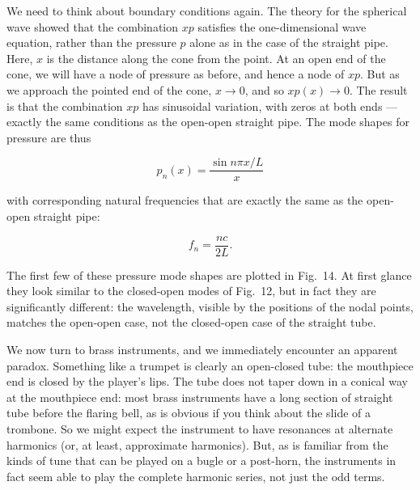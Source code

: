 
  We need to think about boundary conditions again. The theory for the 
  spherical wave showed that the combination $xp$ satisfies the one-dimensional 
  wave equation, rather than the pressure $p$ alone as in the case of the 
  straight pipe. Here, $x$ is the distance along the cone from the point. At an 
  open end of the cone, we will have a node of pressure as before, and hence a 
  node of $xp$. But as we approach the pointed end of the cone, $x \rightarrow 
  0$, and so $xp(x) \rightarrow 0$. The result is that the combination $xp$ has 
  sinusoidal variation, with zeros at both ends --- exactly the same conditions 
  as the open-open straight pipe. The mode shapes for pressure are thus 

  \begin{equation*}p_n(x)=\dfrac{\sin n \pi x/L}{x} \tag{3}\end{equation*} 

  \noindent{}with corresponding natural frequencies that are exactly the same 
  as the open-open straight pipe: 

  \begin{equation*}f_n=\frac{nc}{2L} . \tag{4}\end{equation*} 

  The first few of these pressure mode shapes are plotted in Fig.\ 14. At first 
  glance they look similar to the closed-open modes of Fig.\ 12, but in fact 
  they are significantly different: the wavelength, visible by the positions of 
  the nodal points, matches the open-open case, not the closed-open case of the 
  straight tube. 


  We now turn to brass instruments, and we immediately encounter an apparent 
  paradox. Something like a trumpet is clearly an open-closed tube: the 
  mouthpiece end is closed by the player's lips. The tube does not taper down 
  in a conical way at the mouthpiece end: most brass instruments have a long 
  section of straight tube before the flaring bell, as is obvious if you think 
  about the slide of a trombone. So we might expect the instrument to have 
  resonances at alternate harmonics (or, at least, approximate harmonics). But, 
  as is familiar from the kinds of tune that can be played on a bugle or a 
  post-horn, the instruments in fact seem able to play the complete harmonic 
  series, not just the odd terms. 

